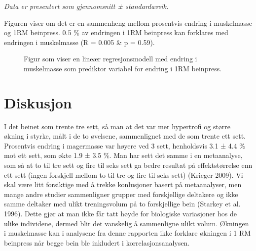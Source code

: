 \documentclass[
  letterpaper,
  DIV=11,
  numbers=noendperiod]{scrreprt}
\begin{document}
\begin{minipage}{\linewidth}
\emph{Data er presentert som gjennomsnitt ± standardavvik.}\\
\end{minipage}
\endgroup

Figuren viser om det er en sammenheng mellom prosentvis endring i
muskelmasse og 1RM beinpress. 0.5 \% av endringen i 1RM beinpress kan
forklares med endringen i muskelmasse (R = 0.005 \& p = 0.59).

\begin{figure}


\caption{\label{fig-figur1}Figur som viser en lineær regresjonsmodell
med endring i muskelmasse som prediktor variabel for endring i 1RM
beinpress.}

\end{figure}%

\section{Diskusjon}\label{diskusjon-5}

I det beinet som trente tre sett, så man at det var mer hypertrofi og
større økning i styrke, målt i de to øvelsene, sammenlignet med de som
trente ett sett. Prosentvis endring i magermasse var høyere ved 3 sett,
henholdsvis 3.1 ± 4.4 \% mot ett sett, som økte 1.9 ± 3.5 \%. Man har
sett det samme i en metaanalyse, som så at to til tre sett og fire til
seks sett ga bedre resultat på effektstørrelse enn ett sett (ingen
forskjell mellom to til tre og fire til seks sett) (Krieger 2009). Vi
skal være litt forsiktige med å trekke konlusjoner basert på
metaanalyser, men mange andre studier sammenligner grupper med
forskjellige deltakere og ikke samme deltaker med ulikt treningsvolum på
to forskjellige bein (Starkey et al. 1996). Dette gjør at man ikke får
tatt høyde for biologiske variasjoner hos de ulike individene, dermed
blir det vanskelig å sammenligne ulikt volum. Økningen i muskelmasse kan
i analysene fra denne rapporten ikke forklare økningen i 1 RM beinpress
når begge bein ble inkludert i korrelasjonsanalysen.
\end{document}
